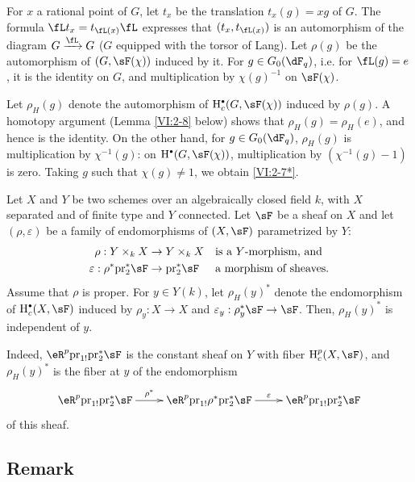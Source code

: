 For $x$ a rational point of $G$, let $t_x$ be the translation $t_x(g) = x g$ 
of $G$. The formula $\fL t_x = t_{\fL(x)} \fL$ expresses that $(t_x,t_{\fL(x)})$ 
is an automorphism of the diagram $G\xrightarrow\fL G$ ($G$ equipped with the torsor of 
Lang). Let $\rho(g)$ be the automorphism of $(G,\sF(\chi))$ induced by it. 
For $g\in G_0(\dF_q)$, i.e. for $\fL(g) = e$, it is the identity on $G$, and 
multiplication by $\chi(g)^{-1}$ on $\sF(\chi)$. 

Let $\rho_H(g)$ denote the automorphism of $\h_c^\bullet(G,\sF(\chi))$ induced by 
$\rho(g)$. A homotopy argument (Lemma \ref{VI:2-8} below) shows that 
$\rho_H(g) = \rho_H(e)$, and hence is the identity. On the other hand, for 
$g\in G_0(\dF_q)$, $\rho_H(g)$ is multiplication by 
$\chi^{-1}(g)$: on $\h^\bullet(G,\sF(\chi))$, multiplication by 
$(\chi^{-1}(g)-1)$ is zero. Taking $g$ such that $\chi(g)\ne 1$, we obtain 
\ref{VI:2-7*}. 





\begin{lemma_}\label{VI:2-8}
Let $X$ and $Y$ be two schemes over an algebraically closed field $k$, with $X$ 
separated and of finite type and $Y$ connected. Let $\sF$ be a sheaf on $X$ and 
let $(\rho,\varepsilon)$ be a family of endomorphisms of $(X,\sF)$ parametrized 
by $Y$: 
\begin{align*} 
  \rho:Y\times_k X &\to Y\times_k X && \text{is a $Y$-morphism, and} \\
  \varepsilon:\rho^\ast \pr_2^\ast \sF &\to \pr_2^\ast\sF && \text{a morphism of sheaves.} 
\end{align*}
Assume that $\rho$ is proper. For $y\in Y(k)$, let $\rho_H(y)^\ast$ denote 
the endomorphism of $\h_c^\bullet(X,\sF)$ induced by $\rho_y:X\to X$ and 
$\varepsilon_y:\rho_y^\ast\sF\to \sF$. Then, $\rho_H(y)^\ast$ is 
independent of $y$. 
\end{lemma_}

Indeed, $\eR^p \pr_{1!} \pr_2^\ast\sF$ is the 
constant sheaf on $Y$ with fiber $\h_c^p(X,\sF)$, and $\rho_H(y)^\ast$ is the 
fiber at $y$ of the endomorphism 
\[\xymatrix{
  \eR^p \pr_{1!} \pr_2^\ast \sF \ar[r]^-{\rho^\ast} 
    & \eR^p \pr_{1!} \rho^\ast \pr_2^\ast \sF \ar[r]^-\varepsilon 
    & \eR^p \pr_{1!} \pr_2^\ast \sF 
}\]
of this sheaf. 





\subsection{Remark}\label{VI:2-9}


